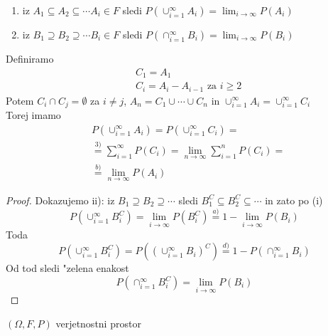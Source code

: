 \documentclass[a4paper,12pt]{article}
\theoremstyle{definition}
\theoremstyle{remark}
\begin{document}
\begin{enumerate}
        \begin{enumerate}
            \item iz $A_1 \subseteq A_2 \subseteq \cdots A_i \in F$ sledi
                $P(\cup_{i=1}^{\infty} A_i) = \lim_{i \to \infty} P(A_i)$
            \item iz $B_1 \supseteq B_2 \supseteq \cdots B_i \in F$ sledi
                $P(\cap_{i=1}^{\infty} B_i) = \lim_{i \to \infty} P(B_i)$
        \end{enumerate}
        Definiramo
        \begin{align*}
            &C_1 = A_1 \\
            &C_i = A_i - A_{i-1} \text{ za } i \geq 2
        \end{align*}
        Potem $C_i \cap C_j = \emptyset$ za $i \neq j$, $A_n = C_1 \cup \cdots \cup C_n$ in
        $\cup_{i=1}^{\infty} A_i = \cup_{i=1}^{\infty} C_i$ \\
        Torej imamo
        \begin{align*}
            &P(\cup_{i=1}^{\infty} A_i) = P(\cup_{i=1}^{\infty} C_i) = \\
            &\stackrel{3)}{=} \sum_{i=1}^{\infty} P(C_i) = \lim_{n \to \infty} \sum_{i=1}^{n} P(C_i) = \\
            &\stackrel{b)}{=} \lim_{n \to \infty} P(A_i) 
        \end{align*}
        \begin{proof}
            Dokazujemo ii):
            iz $B_1 \supseteq B_2 \supseteq \cdots$ sledi $B_1^C \subseteq B_2^C \subseteq \cdots$ in zato po (i)
            \begin{equation*}
                P(\cup_{i=1}^{\infty} B_i^C) = \lim_{i \to \infty} P(B_i^C) \stackrel{a)}{=} 1 - \lim_{i \to \infty} P(B_i)
            \end{equation*}
            Toda
            \begin{equation*}
                P(\cup_{i=1}^{\infty} B_i^C) = P((\cup_{i=1}^{\infty} B_i)^C) \stackrel{d)}{=} 1 - P(\cap_{i=1}^{\infty} B_i)
            \end{equation*}
            Od tod sledi "zelena enakost
            \begin{equation*}
                P(\cap_{i=1}^{\infty} B_i^C) = \lim_{i \to \infty} P(B_i)
            \end{equation*}
        \end{proof}
\end{enumerate}

$(\Omega, F, P)$ verjetnostni prostor
\end{document}

